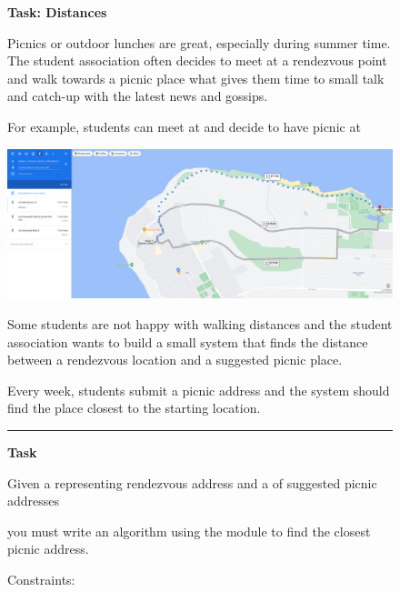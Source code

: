 \begin{figure}
\begin{mdframed}[backgroundcolor=gray!05] 
\begin{scriptsize}

{\large \textbf{Task: Distances}} \bigskip


Picnics or outdoor lunches are great, especially during summer time. The student association often decides to meet at a rendezvous point and walk towards a picnic place what gives them time to small talk and catch-up with the latest news and gossips. \medskip

For example, students can meet at 
and decide to have picnic at 
  \medskip

\medskip

\includegraphics[width=\textwidth]{appendix/cp6/jericho.png}

\medskip


Some students are not happy with walking distances and the student association wants to build a small system that finds the distance between a rendezvous location and a suggested picnic place.  \medskip

Every week, students submit a picnic address and the system should find the place closest to the starting location. \medskip


\begin{center}
\rule{10cm}{0.4pt}
\end{center}

\textbf{Task} \medskip



Given a 
representing rendezvous address and a 
of suggested picnic addresses

you must write an algorithm using the 
module to find the closest picnic address. \medskip


Constraints:


\end{scriptsize}
\end{mdframed}
\end{figure}
